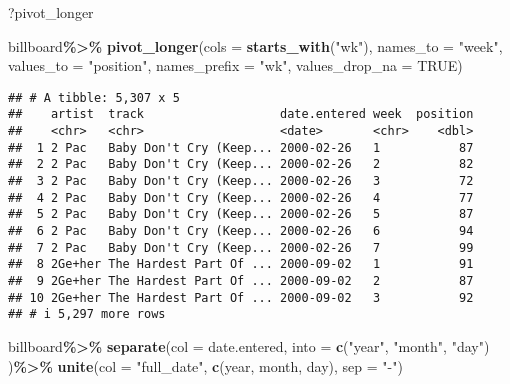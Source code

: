 \documentclass[
]{article}
\newenvironment{Shaded}{\begin{snugshade}}{\end{snugshade}}
\newcommand{\AttributeTok}[1]{\textcolor[rgb]{0.13,0.29,0.53}{#1}}
\newcommand{\ConstantTok}[1]{\textcolor[rgb]{0.56,0.35,0.01}{#1}}
\newcommand{\FunctionTok}[1]{\textcolor[rgb]{0.13,0.29,0.53}{\textbf{#1}}}
\newcommand{\NormalTok}[1]{#1}
\newcommand{\SpecialCharTok}[1]{\textcolor[rgb]{0.81,0.36,0.00}{\textbf{#1}}}
\newcommand{\StringTok}[1]{\textcolor[rgb]{0.31,0.60,0.02}{#1}}
\begin{document}
\begin{Shaded}
\begin{Highlighting}[]
\NormalTok{?pivot\_longer}
\end{Highlighting}
\end{Shaded}

\begin{Shaded}
\begin{Highlighting}[]
\NormalTok{billboard}\SpecialCharTok{\%\textgreater{}\%}
  \FunctionTok{pivot\_longer}\NormalTok{(}\AttributeTok{cols =} \FunctionTok{starts\_with}\NormalTok{(}\StringTok{"wk"}\NormalTok{),}
               \AttributeTok{names\_to =} \StringTok{"week"}\NormalTok{,}
               \AttributeTok{values\_to =} \StringTok{"position"}\NormalTok{,}
               \AttributeTok{names\_prefix =} \StringTok{"wk"}\NormalTok{,}
               \AttributeTok{values\_drop\_na =} \ConstantTok{TRUE}\NormalTok{)}
\end{Highlighting}
\end{Shaded}

\begin{verbatim}
## # A tibble: 5,307 x 5
##    artist  track                   date.entered week  position
##    <chr>   <chr>                   <date>       <chr>    <dbl>
##  1 2 Pac   Baby Don't Cry (Keep... 2000-02-26   1           87
##  2 2 Pac   Baby Don't Cry (Keep... 2000-02-26   2           82
##  3 2 Pac   Baby Don't Cry (Keep... 2000-02-26   3           72
##  4 2 Pac   Baby Don't Cry (Keep... 2000-02-26   4           77
##  5 2 Pac   Baby Don't Cry (Keep... 2000-02-26   5           87
##  6 2 Pac   Baby Don't Cry (Keep... 2000-02-26   6           94
##  7 2 Pac   Baby Don't Cry (Keep... 2000-02-26   7           99
##  8 2Ge+her The Hardest Part Of ... 2000-09-02   1           91
##  9 2Ge+her The Hardest Part Of ... 2000-09-02   2           87
## 10 2Ge+her The Hardest Part Of ... 2000-09-02   3           92
## # i 5,297 more rows
\end{verbatim}

\begin{Shaded}
\begin{Highlighting}[]
\NormalTok{billboard}\SpecialCharTok{\%\textgreater{}\%}
  \FunctionTok{separate}\NormalTok{(}\AttributeTok{col =}\NormalTok{ date.entered, }\AttributeTok{into =} \FunctionTok{c}\NormalTok{(}\StringTok{"year"}\NormalTok{, }\StringTok{"month"}\NormalTok{, }\StringTok{"day"}\NormalTok{) )}\SpecialCharTok{\%\textgreater{}\%}
  \FunctionTok{unite}\NormalTok{(}\AttributeTok{col =} \StringTok{"full\_date"}\NormalTok{, }\FunctionTok{c}\NormalTok{(year, month, day), }\AttributeTok{sep =} \StringTok{"{-}"}\NormalTok{)}
\end{Highlighting}
\end{Shaded}
\end{document}
